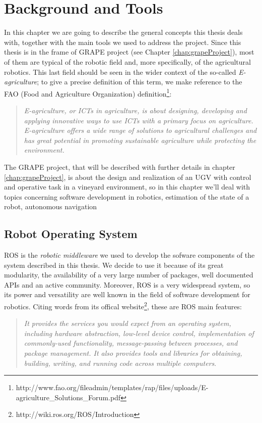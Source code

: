 
\chapter{Background and Tools} \label{chap:backgroundAndToolsChapter}

In this chapter we are going to describe the general concepts this thesis deals with, together with the main tools we used to address the project. Since this thesis is in the frame of \ac{GRAPE} project (see Chapter \ref{chap:grapeProject}),  most of them are typical of the robotic field and, more specifically, of the agricultural robotics. This last field should be seen in the wider context of the so-called \textit{E-agriculture}; to give a precise definition of this term, we make reference to the FAO (Food and Agriculture Organization) definition\footnote{http://www.fao.org/fileadmin/templates/rap/files/uploads/E-agriculture\_Solutions\_Forum.pdf}:
\blockquote{\textit{E-agriculture, or ICTs in agriculture, is about designing,
developing and applying innovative ways to use ICTs with a
primary focus on agriculture. E-agriculture offers a wide range
of solutions to agricultural challenges and has great potential
in promoting sustainable agriculture while protecting the
environment.}}
The \ac{GRAPE} project, that will be described with further details in chapter \ref{chap:grapeProject}, is about the design and realization of an \ac{UGV} with control and operative task in a vineyard environment, so in this chapter we'll deal with topics concerning software development in robotics, estimation of the state of a robot, autonomous navigation


\section{Robot Operating System}\label{sec:robotOperatingSystem}
\ac{ROS} is the \textit{robotic middleware} we used to develop the sofware components of the system described in this thesis. We decide to use it because of its great modularity, the availability of a very large number of packages, well documented APIs and an active community. Moreover, \ac{ROS} is a very widespread system, so its power and versatility are well known in the field of software development for robotics. Citing words from its offical website\footnote{http://wiki.ros.org/ROS/Introduction},
these are \ac{ROS} main features: 
\blockquote{
\textit{It provides the services you would expect from an operating system, including hardware abstraction, low-level device control, implementation of commonly-used functionality, message-passing between processes, and package management. It also provides tools and libraries for obtaining, building, writing, and running code across multiple computers}.
} 

